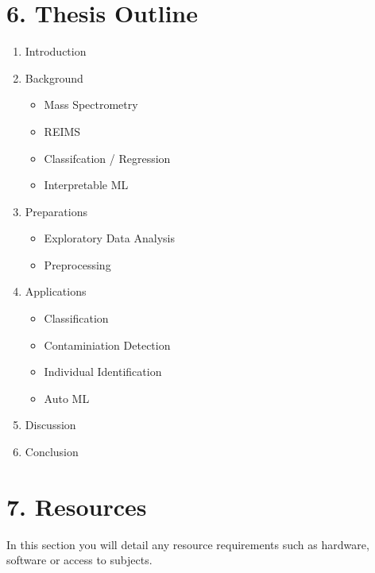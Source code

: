 \documentclass[11pt, a4paper, twoside, openright]{report}
\begin{document}
\section*{6. Thesis Outline}

\begin{enumerate}
  \item Introduction 
  \item Background 
  \begin{itemize}
    \item Mass Spectrometry 
    \item REIMS 
    \item Classifcation / Regression 
    \item Interpretable ML
  \end{itemize}
  \item Preparations
  \begin{itemize}
    \item Exploratory Data Analysis 
    \item Preprocessing 
  \end{itemize}
  \item Applications 
  \begin{itemize}
    \item Classification 
    \item Contaminiation Detection 
    \item Individual Identification 
    \item Auto ML  
  \end{itemize} 
  \item Discussion 
  \item Conclusion
\end{enumerate}

\section*{7. Resources}

In this section you will detail any resource requirements such as
hardware, software or access to subjects.
\end{document}
